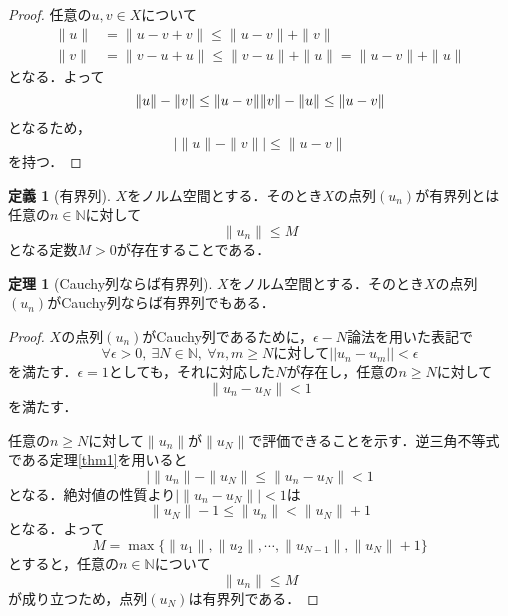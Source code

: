 \documentclass[11pt,a4paper]{jsarticle}
\theoremstyle{definition}
\newtheorem{dfn}{定義}
\newtheorem{thm}{定理}
\begin{document}
\begin{proof}
  任意の$u,v\in X$について
  \begin{align*}
    \|u\| & =\|u-v+v\|\leq\|u-v\|+\|v\|               \\
    \|v\| & =\|v-u+u\|\leq\|v-u\|+\|u\|=\|u-v\|+\|u\|
  \end{align*}
  となる．よって
  \begin{equation*}
    \|u\|-\|v\|\leq\|u-v\| \\
    \|v\|-\|u\|\leq\|u-v\|
  \end{equation*}
  となるため，
  \begin{equation*}
    |\|u\|-\|v\||\leq\|u-v\|
  \end{equation*}
  を持つ．
\end{proof}

\begin{dfn}[有界列]
  $X$をノルム空間とする．そのとき$X$の点列$(u_n)$が有界列とは任意の$n\in\mathbb{N}$に対して
  \begin{equation*}
    \|u_n\|\leq M
  \end{equation*}
  となる定数$M>0$が存在することである．
\end{dfn}

\begin{thm}[Cauchy列ならば有界列]
  $X$をノルム空間とする．そのとき$X$の点列$(u_n)$がCauchy列ならば有界列でもある．
\end{thm}

\begin{proof}
  $X$の点列$(u_n)$がCauchy列であるために，$\epsilon -N$論法を用いた表記で
  \begin{equation*}
    \forall\epsilon >0, \ \exists N\in \mathbb{N}, \ \forall n,m \geq Nに対して||u_n-u_m||<\epsilon
  \end{equation*}
  を満たす．$\epsilon=1$としても，それに対応した$N$が存在し，任意の$n\geq N$に対して
  \begin{equation*}
    \|u_n-u_N\|<1
  \end{equation*}
  を満たす．

  任意の$n\geq N$に対して$\|u_n\|$が$\|u_N\|$で評価できることを示す．逆三角不等式である定理\ref{thm1}を用いると
  \begin{equation*}
    |\|u_n\|-\|u_N\|\leq \|u_n-u_N\|<1
  \end{equation*}
  となる．絶対値の性質より$|\|u_n-u_N\||<1$は
  \begin{equation*}
    \|u_N\|-1\leq\|u_n\|<\|u_N\|+1
  \end{equation*}
  となる．よって
  \begin{equation*}
    M=\max\{\|u_1\|,\|u_2\|,\cdots,\|u_{N-1}\|,\|u_N\|+1\}
  \end{equation*}
  とすると，任意の$n\in \mathbb{N}について$
  \begin{equation*}
    \|u_n\|\leq M
  \end{equation*}
  が成り立つため，点列$(u_N)$は有界列である．
\end{proof}
\end{document}

